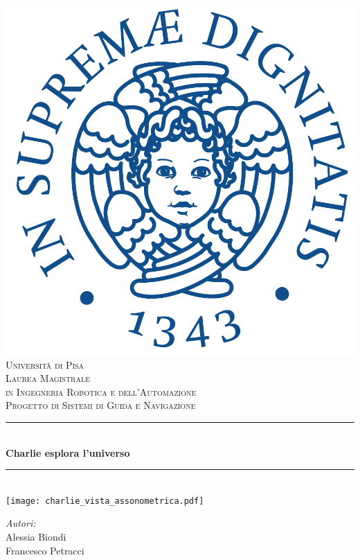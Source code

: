 \begin{titlepage}
	\centering
	\vspace*{0.0 cm}
	\includegraphics[height=.2\textheight]{figs/cherubino_pant541.pdf}\\[0.5 cm]			%
	\textsc{\Large Universit\`a di Pisa }\\[0.5 cm]							%
	\textsc{\large Laurea Magistrale \\ 
		\vspace{2mm} in Ingegneria Robotica e dell'Automazione}\\[0.5 cm]
	\textsc{Progetto di Sistemi di Guida e Navigazione}\\[0.25 cm]	
	
	\rule{\linewidth}{0.2 mm} \\[0.4 cm]
	{ \Large{\textbf{Charlie esplora l'universo}}}\\
	\rule{\linewidth}{0.2 mm} \\[0.5 cm]
	
	\texttt{[image: charlie\_vista\_assonometrica.pdf]}\\	
	\vspace{1 cm}
	
	
	\begin{minipage}{0.48\textwidth}
		\begin{flushleft}
			\textit{Autori:}\\
			Alessia Biondi\\
			Francesco Petracci
			

\end{flushleft}
\end{minipage}
\end{titlepage}
